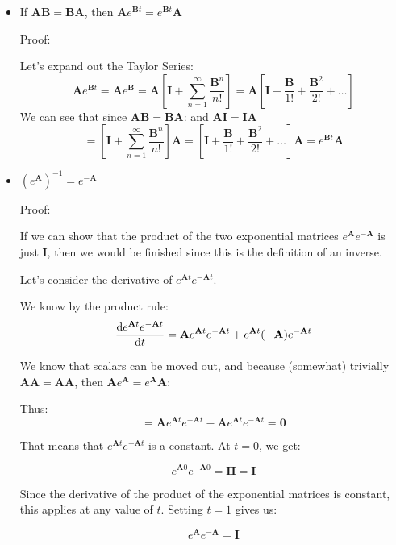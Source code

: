 \documentclass{report}
\begin{document}
{\begin{itemize}
    QED

    \item If $\mathbf{AB = BA}$, then $\mathbf{A}e^{\mathbf{B}t} = e^{\mathbf{B}t}\mathbf{A}$
    
    Proof:
    
    Let's expand out the Taylor Series:
    $$\mathbf{A}e^{\mathbf{B}t} = 
    \mathbf{A}e^{\mathbf{B}} = \mathbf{A}\left[\mathbf{I} + \sum_{n=1}^\infty \frac{{\mathbf{B}}^n}{n!} \right] = \mathbf{A}\left[\mathbf{I} + \frac{\mathbf{B}}{1!} + \frac{\mathbf{B}^2}{2!} + \dots \right]
    $$
    We can see that since $\mathbf{AB = BA}$: and $\mathbf{AI = IA}$
    $$
    = \left[\mathbf{I} + \sum_{n=1}^\infty \frac{{\mathbf{B}}^n}{n!} \right]\mathbf{A} = \left[\mathbf{I} + \frac{\mathbf{B}}{1!} + \frac{\mathbf{B}^2}{2!} + \dots \right]\mathbf{A}
    = e^{\mathbf{B}t}\mathbf{A}$$
    
    \item  $(e^{\mathbf{A}})^{-1} = e^{-\mathbf{A}}$
    
    Proof:
    
    If we can show that the product of the two exponential matrices  $e^{\mathbf{A}}e^{-\mathbf{A}}$ is just $\mathbf{I}$, then we would be finished since this is the definition of an inverse.
    
    Let's consider the derivative of $e^{\mathbf{A}t}e^{-\mathbf{A}t}$. 
    
    We know by the product rule:
    $$
    \dv{e^{\mathbf{A}t}e^{-\mathbf{A}t}}{t} = \mathbf{A}e^{\mathbf{A}t}e^{-\mathbf{A}t} + e^{\mathbf{A}t}(-\mathbf{A})e^{-\mathbf{A}t}
    $$
    
    We know that scalars can be moved out, and because (somewhat) trivially $\mathbf{AA} = \mathbf{AA}$, then $\mathbf{A}e^{\mathbf{A}} = e^{\mathbf{A}}\mathbf{A}$:
    
    Thus:
    $$
    = \mathbf{A}e^{\mathbf{A}t}e^{-\mathbf{A}t} -\mathbf{A}e^{\mathbf{A}t}e^{-\mathbf{A}t} = \mathbf{0}
    $$
    
    That means that $e^{\mathbf{A}t}e^{-\mathbf{A}t}$ is a constant. At $t=0$, we get:
    
    $$e^{\mathbf{A}0}e^{-\mathbf{A}0} = \mathbf{II} = \mathbf{I}$$
    
    Since the derivative of the product of the exponential matrices is constant, this applies at any value of $t$. Setting $t=1$ gives us:
    
    $$e^{\mathbf{A}}e^{-\mathbf{A}} = \mathbf{I}$$

    
    

\end{itemize}}
\end{document}
